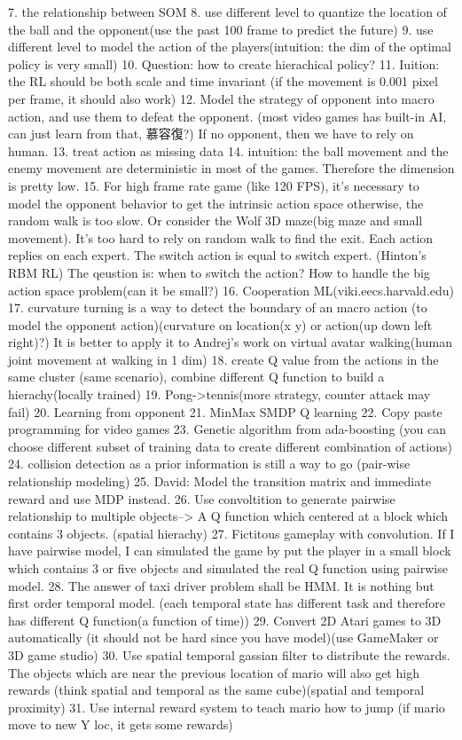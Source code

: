7. the relationship between SOM
8. use different level to quantize the location of the ball and the opponent(use the past 100 frame to predict the future)
9. use different level to model the action of the players(intuition: the dim of the optimal policy is very small)
10. Question: how to create hierachical policy?
11. Iuition: the RL should be both scale and time invariant (if the movement is 0.001 pixel per frame, it should also work)
12. Model the strategy of opponent into macro action, and use them to defeat the opponent. (most video games has built-in AI, can just learn from that, 慕容復?)
If no opponent, then we have to rely on human.
13. treat action as missing data
14. intuition: the ball movement and the enemy movement are deterministic in most of the games. Therefore the dimension is pretty low.
15. For high frame rate game (like 120 FPS), it's necessary to model the opponent behavior to get the intrinsic action space
otherwise, the random walk is too slow. Or consider the Wolf 3D maze(big maze and small movement). It's too hard to rely on random walk to find the exit.
Each action replies on each expert. The switch action is equal to switch expert. (Hinton's RBM RL)
The qeustion is: when to switch the action? How to handle the big action space problem(can it be small?)
16. Cooperation ML(viki.eecs.harvald.edu)
17. curvature turning is a way to detect the boundary of an macro action (to model the opponent action)(curvature on location(x y) or action(up down left right)?)
It is better to apply it to Andrej's work on virtual avatar walking(human joint movement at walking in 1 dim)
18. create Q value from the actions in the same cluster (same scenario), combine different Q function to build a hierachy(locally trained)
19. Pong->tennis(more strategy, counter attack may fail)
20. Learning from opponent
21. MinMax SMDP Q learning
22. Copy paste programming for video games
23. Genetic algorithm from ada-boosting (you can choose different subset of training data to create different combination 
of actions)
24. collision detection as a prior information is still a way to go (pair-wise relationship modeling)
25. David: Model the transition matrix and immediate reward and use MDP instead.
26. Use convoltition to generate pairwise relationship to multiple objects--> A Q function which centered at a block which contains 
3 objects. (spatial hierachy)
27. Fictitous gameplay with convolution. If I have pairwise model, I can simulated the game by put the player in a 
small block which contains 3 or five objects and simulated the real Q function using pairwise model.
28. The answer of taxi driver problem shall be HMM. It is nothing but first order temporal model. (each temporal
state has different task and therefore has different Q function(a function of time))
29. Convert 2D Atari games to 3D automatically (it should not be hard since you have model)(use GameMaker or 3D game studio)
30. Use spatial temporal gassian filter to distribute the rewards. The objects which are near the previous location of mario
will also get high rewards (think spatial and temporal as the same cube)(spatial and temporal proximity)
31. Use internal reward system to teach mario how to jump (if mario move to new Y loc, it gets some rewards)
